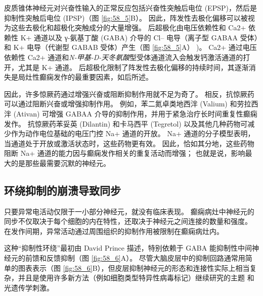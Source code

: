 皮质锥体神经元对兴奋性输入的正常反应包括兴奋性突触后电位 (EPSP)，然后是抑制性突触后电位 (IPSP)（图 \ref{fig:58_5}B）。
因此，阵发性去极化偏移可以被视为这些去极化和超极化突触成分的大量增强。
后超极化由电压依赖性和 Ca2+ 依赖性 K+ 通道以及 γ-氨基丁酸 (GABA) 介导的 Cl– 电导（离子型 GABAA 受体）和 K+ 电导（代谢型 GABAB 受体）产生（图 \ref{fig:58_5}A） )。
Ca2+ 通过电压依赖性 Ca2+ 通道和\textit{N-甲基-D-天冬氨酸}型受体通道流入会触发钙激活通道的打开，尤其是 K+ 通道。
后超极化限制了阵发性去极化偏移的持续时间，其逐渐消失是局灶性癫痫发作的最重要因素，如后所述。


因此，许多惊厥药通过增强兴奋或阻断抑制作用就不足为奇了。
相反，抗惊厥药可以通过阻断兴奋或增强抑制作用。 例如，苯二氮卓类地西泮 (Valium) 和劳拉西泮 (Ativan) 可增强 GABAA 介导的抑制作用，并用于紧急治疗长时间重复性癫痫发作。
抗惊厥药苯妥英 (Dilantin) 和卡马西平 (Tegretol) 以及其他几种药物可减少作为动作电位基础的电压门控 Na+ 通道的开放。 Na+ 通道的分子模型表明，当通道处于开放或激活状态时，这些药物更有效。
因此，恰如其分地，这些药物阻断 Na+ 通道的能力因与癫痫发作相关的重复活动而增强；
也就是说，影响最大的是那些最需要沉默的神经元。



\subsection{环绕抑制的崩溃导致同步}

只要异常电活动仅限于一小部分神经元，就没有临床表现。
癫痫病灶中神经元的同步不仅取决于每个细胞的内在特性，还取决于神经元之间连接的数量和强度。
在发作间期，异常活动通过周围组织的抑制作用被限制在癫痫病灶内。


这种“抑制性环绕”最初由 David Prince 描述，特别依赖于 GABA 能抑制性中间神经元的前馈和反馈抑制（图 \ref{fig:58_6}A）。
尽管大脑皮层中的抑制回路通常用简单的图表表示（图 \ref{fig:58_6}B），但皮层抑制神经元的形态和连接性实际上相当复杂，并且是使用许多新方法（例如细胞类型特异性病毒标记）继续研究的主题 和光遗传学刺激。


